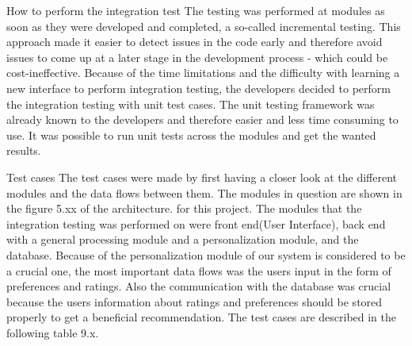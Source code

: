 How to perform the integration test\newline
The testing was performed at modules as soon as they were developed and completed, a so-called incremental testing. This approach made it easier to detect issues in the code early and therefore avoid issues to come up at a later stage in the development process - which could be cost-ineffective.
Because of the time limitations and the difficulty with learning a new interface to perform integration testing, the developers decided to perform the integration testing with unit test cases. The unit testing framework was already known to the developers and therefore easier and less time consuming to use. It was possible to run unit tests across the modules and get the wanted results.\newline

Test cases\newline 
The test cases were made by first having a closer look at the different modules and the data flows between them. The modules in question are shown in the figure 5.xx of the architecture. for this project. The modules that the integration testing was performed on were front end(User Interface), back end with a general processing module and a personalization module, and the database. Because of the personalization module of our system is considered to be a crucial one, the most important data flows was the users input in the form of preferences and ratings. Also the communication with the database was crucial because the users information about ratings and preferences should be stored properly to get a beneficial recommendation. The test cases are described in the following table 9.x.

